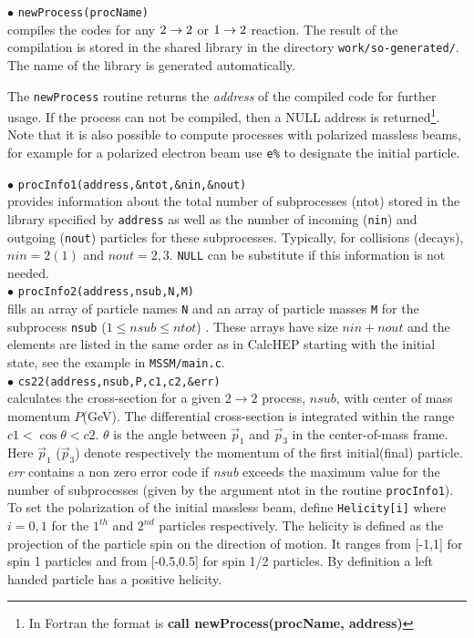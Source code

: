 \documentclass[12pt,a4paper]{article}
\begin{document}
\noindent
$\bullet$ \verb|newProcess(procName)|\\
compiles the  codes for any $2\rightarrow 2$ or  $1\rightarrow 2$  reaction.
The result of the compilation is stored in the  shared library  in the directory \verb|work/so-generated/|. The name of the library is generated
automatically.

The \verb|newProcess| routine returns the
{\it address} of the compiled code for further usage.   If the
process can not be compiled, then a NULL address is
returned\footnote{ In Fortran the  format is
{\bf call  newProcess(procName, address)}  }.
Note that it is also possible to compute processes with polarized massless beams, 
for example for a polarized electron beam use \verb|e%| to designate the initial
particle.




\noindent
$\bullet$ \verb|procInfo1(address,&ntot,&nin,&nout)|\\
provides information  about the total number of subprocesses
(ntot) stored in the library  specified by {\tt address} as well
as the number of incoming (\verb|nin|) and outgoing (\verb|nout|) particles for
these subprocesses. Typically, for collisions (decays), $nin=2(1)$ and $nout=2,3$.
\verb|NULL| can be substitute if this information is not needed. \\
$\bullet$ \verb|procInfo2(address,nsub,N,M)|\\
fills an array of
particle names \verb|N| and an array of particle  masses \verb|M| for the subprocess \verb|nsub| ($1\leq nsub \leq ntot$) . These
arrays have size $nin+nout$ and the elements are listed in the same order
as in CalcHEP starting with the initial state, see the example in 
\verb|MSSM/main.c|.\\



\noindent
$\bullet$ \verb|cs22(address,nsub,P,c1,c2,&err)|\\
calculates  the cross-section for a given $2\rightarrow 2$
process, $nsub$, with  center of mass momentum $P$(GeV). The
differential cross-section is integrated
 within the range  $ c1 < \cos\theta <c2 $. $\theta$ is
the angle between $\vec{p}_1$ and $\vec{p}_3$  in the
center-of-mass frame. Here $\vec{p}_1$ ($\vec{p}_3$) denote
respectively the momentum of the first initial(final) particle.
{\it err} contains a non zero error code if {\it nsub} exceeds the
maximum value  for the number of subprocesses (given by the
argument ntot in the routine {\tt procInfo1}). To set the polarization 
of the initial massless beam, define   \verb|Helicity[i]|  where $i=0,1$ 
for the $1^{th}$ and $2^{nd}$ particles respectively.
The   helicity is defined as the projection of the particle spin
on the direction of motion. It ranges from  [-1,1] for spin 1 particles and 
from [-0.5,0.5]  for spin 1/2 particles.
By definition a left handed particle has a positive
helicity. 
\end{document}
